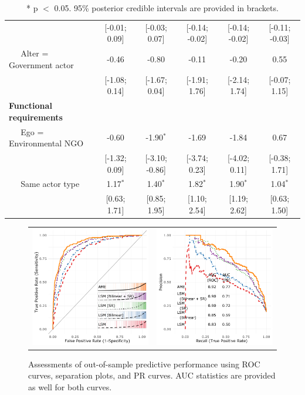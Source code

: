 \documentclass[12pt,pdflatex]{elsarticle}
\begin{document}
\begin{table}[ht]
\begin{tabular}{lccccc}
   & [-0.01; 0.09] & [-0.03; 0.07] & [-0.14; -0.02] & [-0.14; -0.02] & [-0.11; -0.03] \\
  $\;\;\;\;$ Alter = Government actor & -0.46 & -0.80 & -0.11 & -0.20 & 0.55 \\
   & [-1.08; 0.14] & [-1.67; 0.04] & [-1.91; 1.76] & [-2.14; 1.74] & [-0.07; 1.15] \\
  \textbf{Functional requirements} &  &  &  &  &  \\
  $\;\;\;\;$ Ego = Environmental NGO & -0.60 & -1.90$^{\ast}$ & -1.69 & -1.84 & 0.67 \\
   & [-1.32; 0.09] & [-3.10; -0.86] & [-3.74; 0.23] & [-4.02; 0.11] & [-0.38; 1.71] \\
  $\;\;\;\;$ Same actor type & 1.17$^{\ast}$ & 1.40$^{\ast}$ & 1.82$^{\ast}$ & 1.90$^{\ast}$ & 1.04$^{\ast}$ \\
   & [0.63; 1.71] & [0.85; 1.95] & [1.10; 2.54] & [1.19; 2.62] & [0.63; 1.50] \\
   \hline
\hline
\end{tabular}
\endgroup
\caption{* p $<$ 0.05. 95\% posterior credible intervals are provided in brackets.}
\label{tab:regTable_latSpace}
\end{table}


\begin{figure}[ht]
	\centering
	\begin{tabular}{cc}
	\includegraphics[width=.5\textwidth]{roc_latSpace_outSample} &
	\includegraphics[width=.5\textwidth]{rocPr_latSpace_outSample}
	\end{tabular}
	\caption{Assessments of out-of-sample predictive performance using ROC curves, separation plots, and PR curves. AUC statistics are provided as well for both curves.}
	\label{fig:roc_latentSpace}
\end{figure}
\end{document}
